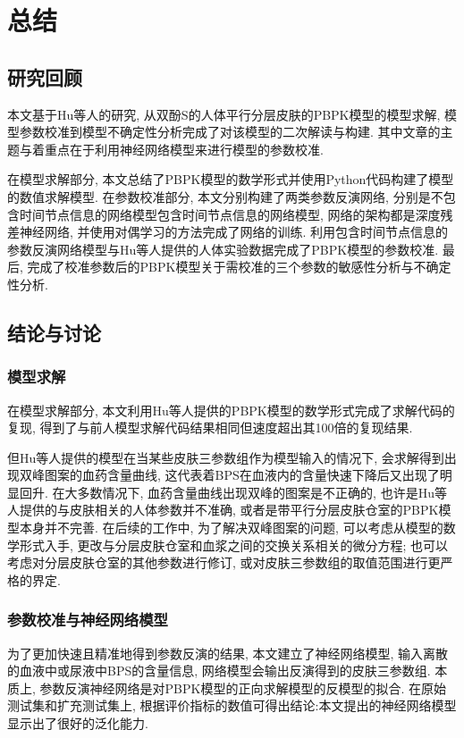 \documentclass[a4paper,punct=banjiao,twoside]{ctexrep}
\theoremstyle{plain}
\theoremstyle{definition}
\theoremstyle{remark}
\begin{document}
\chapter{总结}

\section*{研究回顾}
本文基于Hu等人\cite{11}的研究, 从双酚S的人体平行分层皮肤的PBPK模型的模型求解, 模型参数校准到模型不确定性分析完成了对该模型的二次解读与构建.
其中文章的主题与着重点在于利用神经网络模型来进行模型的参数校准.

在模型求解部分, 本文总结了PBPK模型的数学形式并使用Python代码构建了模型的数值求解模型. 在参数校准部分, 本文分别构建了两类参数反演网络, 分别是不包含时间节点信息的网络模型包含时间节点信息的网络模型, 
网络的架构都是深度残差神经网络, 并使用对偶学习的方法完成了网络的训练. 利用包含时间节点信息的参数反演网络模型与Hu等人\cite{11}提供的人体实验数据完成了PBPK模型的参数校准. 
最后, 完成了校准参数后的PBPK模型关于需校准的三个参数的敏感性分析与不确定性分析.

\section*{结论与讨论}
\subsection*{模型求解}
在模型求解部分, 本文利用Hu等人\cite{11}提供的PBPK模型的数学形式完成了求解代码的复现, 得到了与前人模型求解代码结果相同但速度超出其100倍的复现结果.

但Hu等人提供的模型在当某些皮肤三参数组作为模型输入的情况下, 会求解得到出现双峰图案的血药含量曲线, 这代表着BPS在血液内的含量快速下降后又出现了明显回升. 在大多数情况下, 血药含量曲线出现双峰的图案是不正确的,
也许是Hu等人提供的与皮肤相关的人体参数并不准确, 或者是带平行分层皮肤仓室的PBPK模型本身并不完善. 在后续的工作中, 
为了解决双峰图案的问题, 可以考虑从模型的数学形式入手, 更改与分层皮肤仓室和血浆之间的交换关系相关的微分方程; 也可以考虑对分层皮肤仓室的其他参数进行修订, 或对皮肤三参数组的取值范围进行更严格的界定.

\subsection*{参数校准与神经网络模型}

为了更加快速且精准地得到参数反演的结果, 本文建立了神经网络模型, 输入离散的血液中或尿液中BPS的含量信息, 网络模型会输出反演得到的皮肤三参数组.
本质上, 参数反演神经网络是对PBPK模型的正向求解模型的反模型的拟合. 在原始测试集和扩充测试集上, 根据评价指标的数值可得出结论:本文提出的神经网络模型显示出了很好的泛化能力.
\end{document}
